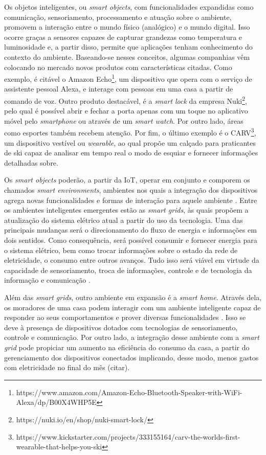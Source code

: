 Os objetos inteligentes, ou \textit{smart objects}, com funcionalidades expandidas como comunicação, sensoriamento, processamento e atuação sobre o ambiente, promovem a interação entre o mundo físico (analógico) e o mundo digital\cite{Stojkoska2017}. Isso ocorre graças a sensores capazes de capturar grandezas como temperatura e luminosidade e, a partir disso, permite que aplicações tenham conhecimento do contexto do ambiente. Baseando-se nesses conceitos, algumas companhias vêm colocando no mercado novos produtos com características citadas. Como exemplo, é citável o Amazon Echo\textsuperscript{\textregistered}\footnote{https://www.amazon.com/Amazon-Echo-Bluetooth-Speaker-with-WiFi-Alexa/dp/B00X4WHP5E}, um dispositivo que opera com o serviço de assistente pessoal Alexa, e interage com pessoas em uma casa a partir de comando de voz. Outro produto destacável, é a \textit{smart lock} da empresa Nuki\textsuperscript{\textregistered}\footnote{https://nuki.io/en/shop/nuki-smart-lock/}, pelo qual é possível abrir e fechar a porta apenas com um toque no aplicativo móvel pelo \textit{smartphone} ou através de um \textit{smart watch}. Por outro lado, áreas como esportes também recebem atenção. Por fim, o último exemplo é o CARV\textsuperscript{\textregistered}\footnote{https://www.kickstarter.com/projects/333155164/carv-the-worlds-first-wearable-that-helps-you-ski}, um dispositivo vestível ou \textit{wearable}, ao qual propõe um calçado para praticantes de ski capaz de analisar em tempo real o modo de esquiar e fornecer informações detalhadas sobre.

Os \textit{smart objects} poderão, a partir da IoT, operar em conjunto e comporem os chamados \textit{smart environments}, ambientes nos quais a integração dos dispositivos agrega novas funcionalidades e formas de interação para aquele ambiente \cite{Asano2016}. Entre os ambientes inteligentes emergentes estão as \textit{smart grids}, às quais propõem a atualização do sistema elétrico atual a partir do uso da tecnologia. Uma das principais mudanças será o direcionamento do fluxo de energia e informações em dois sentidos. Como consequência, será possível consumir e fornecer energia para o sistema elétrico, bem como trocar informações sobre o estado da rede de eletricidade, o consumo entre outros avanços. Tudo isso será viável em virtude da capacidade de sensoriamento, troca de informações, controle e de tecnologia da informação e comunicação \cite{Cecilia2016}.  

Além das \textit{smart grids}, outro ambiente em expansão é a \textit{smart home}. Através dela, os moradores de uma casa podem interagir com um ambiente inteligente capaz de responder ao seus comportamentos e prover diversas funcionalidades \cite{DeSilva2012}. Isso se deve à presença de dispositivos dotados com tecnologias de sensoriamento, controle e comunicação. Por outro lado, a integração desse ambiente com a \textit{smart grid} pode propiciar um aumento na eficiência do consumo da casa, a partir do gerenciamento dos dispositivos conectados implicando, desse modo, menos gastos com eletricidade no final do mês (citar).

